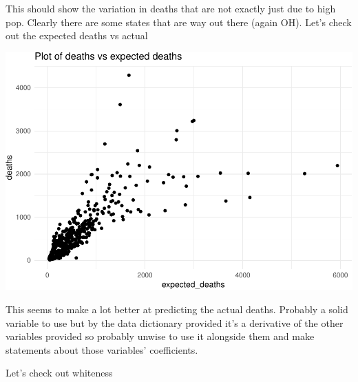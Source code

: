 \documentclass[]{article}
\newenvironment{Shaded}{\begin{snugshade}}{\end{snugshade}}
\newcommand{\DataTypeTok}[1]{\textcolor[rgb]{0.13,0.29,0.53}{#1}}
\newcommand{\KeywordTok}[1]{\textcolor[rgb]{0.13,0.29,0.53}{\textbf{#1}}}
\newcommand{\NormalTok}[1]{#1}
\newcommand{\OperatorTok}[1]{\textcolor[rgb]{0.81,0.36,0.00}{\textbf{#1}}}
\newcommand{\StringTok}[1]{\textcolor[rgb]{0.31,0.60,0.02}{#1}}
\begin{document}
This should show the variation in deaths that are not exactly just due
to high pop. Clearly there are some states that are way out there (again
OH). Let's check out the expected deaths vs actual

\begin{Shaded}
\end{Shaded}

\includegraphics{Assignment_1_files/figure-latex/plots5-1.pdf}

This seems to make a lot better at predicting the actual deaths.
Probably a solid variable to use but by the data dictionary provided
it's a derivative of the other variables provided so probably unwise to
use it alongside them and make statements about those variables'
coefficients.

Let's check out whiteness

\begin{Shaded}
\end{Shaded}
\end{document}
